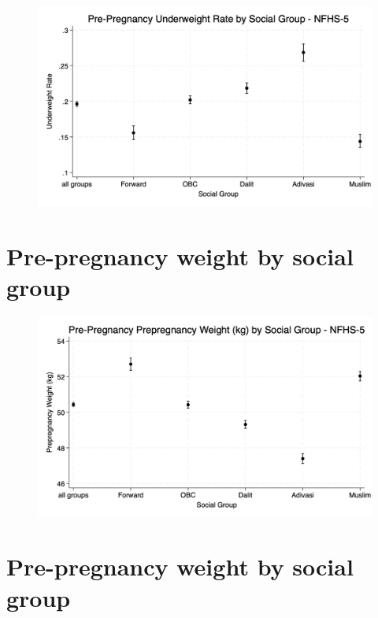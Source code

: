 \documentclass{article}
\begin{document}
\begin{figure}[H]
    \centering
    \includegraphics[width=\textwidth]{figures/bootstrapped_underweight_by_group.png}
\end{figure}

\section{Pre-pregnancy weight by social group}

\begin{figure}[H]
    \centering
    \includegraphics[width=\textwidth]{figures/bootstrapped_weight_by_group.png}
\end{figure}

\section{Pre-pregnancy weight by social group}
\end{document}
